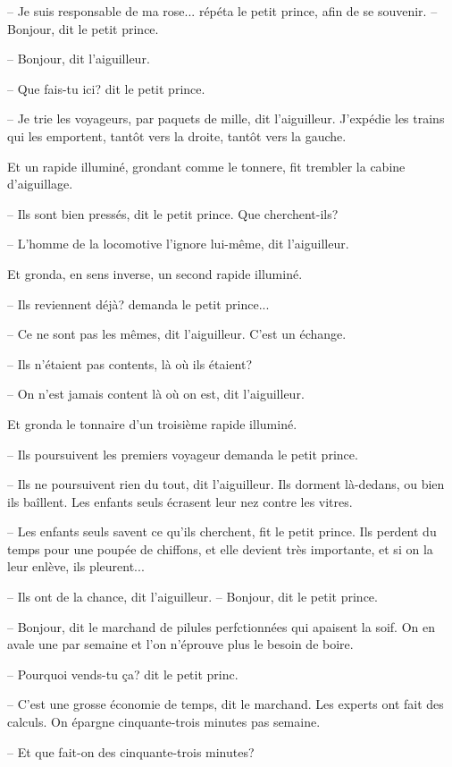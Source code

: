 \documentclass[a4paper]{report}
\begin{document}
-- Je suis responsable de ma rose... répéta le petit prince, afin de se souvenir.
\parachapter{} %
-- Bonjour, dit le petit prince.

-- Bonjour, dit l'aiguilleur.

-- Que fais-tu ici? dit le petit prince.

-- Je trie les voyageurs, par paquets de mille, dit l'aiguilleur. J'expédie les trains qui les emportent, tantôt vers la droite, tantôt vers la gauche.

Et un rapide illuminé, grondant comme le tonnere, fit trembler la cabine d'aiguillage.

-- Ils sont bien pressés, dit le petit prince. Que cherchent-ils?

-- L'homme de la locomotive l'ignore lui-même, dit l'aiguilleur.

Et gronda, en sens inverse, un second rapide illuminé.

-- Ils reviennent déjà? demanda le petit prince...

-- Ce ne sont pas les mêmes, dit l'aiguilleur. C'est un échange.

-- Ils n'étaient pas contents, là où ils étaient?

-- On n'est jamais content là où on est, dit l'aiguilleur.

Et gronda le tonnaire d'un troisième rapide illuminé.

-- Ils poursuivent les premiers voyageur demanda le petit prince.

-- Ils ne poursuivent rien du tout, dit l'aiguilleur. Ils dorment là-dedans, ou bien ils ba\^illent. Les enfants seuls écrasent leur nez contre les vitres.

-- Les enfants seuls savent ce qu'ils cherchent, fit le petit prince. Ils perdent du temps pour une poupée de chiffons, et elle devient très importante, et si on la leur enlève, ils pleurent...

-- Ils ont de la chance, dit l'aiguilleur.
\parachapter{} %
-- Bonjour, dit le petit prince.

-- Bonjour, dit le marchand de pilules perfctionnées qui apaisent la soif. On en avale une par semaine et l'on n'éprouve plus le besoin de boire.

-- Pourquoi vends-tu ça? dit le petit princ.

-- C'est une grosse économie de temps, dit le marchand. Les experts ont fait des calculs. On épargne cinquante-trois minutes pas semaine.

-- Et que fait-on des cinquante-trois minutes?
\end{document}

